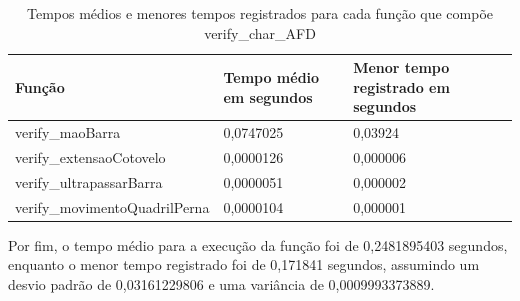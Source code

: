 \begin{table}[h]
	\centering
	\begin{tabular}{|p{6cm}|p{3cm}|p{5cm}|}
	\hline
	\textbf{Função} & \textbf{Tempo médio em segundos} & \textbf{Menor tempo registrado em segundos} \\
	\hline
	verify\_maoBarra & 0,0747025 & 0,03924 \\
	verify\_extensaoCotovelo & 0,0000126 & 0,000006  \\
	verify\_ultrapassarBarra & 0,0000051 & 0,000002  \\
	verify\_movimentoQuadrilPerna & 0,0000104 & 0,000001  \\
	\hline
	\end{tabular}
	\caption{Tempos médios e menores tempos registrados para cada função que compõe verify\_char\_AFD}
	\label{tab:tempos_funcoes_especificas}
\end{table}
		
Por fim, o tempo médio para a execução da função  foi de 0,2481895403 segundos, enquanto o menor tempo registrado foi de 0,171841 segundos, assumindo um desvio padrão de 0,03161229806 e uma variância de 0,0009993373889.
